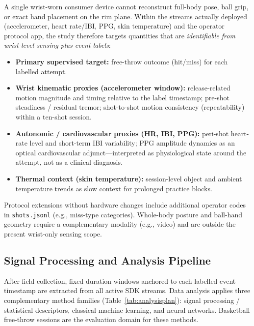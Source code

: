 \documentclass[sensors,article,submit,pdftex,moreauthors]{Definitions/mdpi}
\begin{document}
\label{sec:measurable}



A single wrist-worn consumer device cannot reconstruct full-body pose, ball grip, or exact hand placement on the rim plane. Within the streams actually deployed (accelerometer, heart rate/IBI, PPG, skin temperature) and the operator protocol app, the study therefore targets quantities that are \emph{identifiable from wrist-level sensing plus event labels}:



\begin{itemize}

\item \textbf{Primary supervised target:} free-throw outcome (hit/miss) for each labelled attempt.

\item \textbf{Wrist kinematic proxies (accelerometer window):} release-related motion magnitude and timing relative to the label timestamp; pre-shot steadiness / residual tremor; shot-to-shot motion consistency (repeatability) within a ten-shot session.

\item \textbf{Autonomic / cardiovascular proxies (HR, IBI, PPG):} peri-shot heart-rate level and short-term IBI variability; PPG amplitude dynamics as an optical cardiovascular adjunct---interpreted as physiological state around the attempt, not as a clinical diagnosis.

\item \textbf{Thermal context (skin temperature):} session-level object and ambient temperature trends as slow context for prolonged practice blocks.

\end{itemize}



Protocol extensions without hardware changes include additional operator codes in \texttt{shots.jsonl} (e.g., miss-type categories). Whole-body posture and ball-hand geometry require a complementary modality (e.g., video) and are outside the present wrist-only sensing scope.



\subsection{Signal Processing and Analysis Pipeline}

\label{sec:analysis}



After field collection, fixed-duration windows anchored to each labelled event timestamp are extracted from all active SDK streams. Data analysis applies three complementary method families (Table~\ref{tab:analysisplan}): signal processing / statistical descriptors, classical machine learning, and neural networks. Basketball free-throw sessions are the evaluation domain for these methods.
\end{document}
